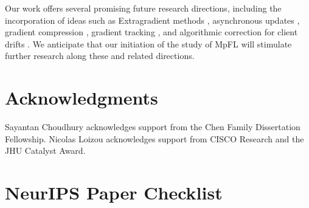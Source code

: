 \documentclass{article}
\theoremstyle{plain}
\theoremstyle{remark}
\begin{document}
Our work offers several promising future research directions, including the incorporation of ideas such as Extragradient methods \citep{Korpelevich1976_extragradient, gorbunov2022extragradient}, asynchronous updates \citep{dean2012large, Stich2019_local}, gradient compression \citep{alistarh2017qsgd}, gradient tracking \citep{nedic2017achieving}, and algorithmic correction for client drifts \citep{KarimireddyKaleMohriReddiStichSuresh2020_scaffold, MishchenkoMalinovskyStichRichtarik2022_proxskip}. 
We anticipate that our initiation of the study of MpFL will stimulate further research along these and related directions.

\newpage

\section*{Acknowledgments}
Sayantan Choudhury acknowledges support from the Chen Family Dissertation Fellowship. Nicolas Loizou acknowledges support from CISCO Research and the JHU Catalyst Award.




\newpage
\section*{NeurIPS Paper Checklist}
\end{document}
